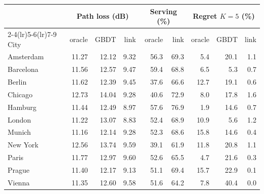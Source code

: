 \begin{tabular}{lrrrrrrrr}
\toprule
& \multicolumn{3}{c}{Path loss (dB)} & \multicolumn{2}{c}{Serving (\%)} & \multicolumn{3}{c}{Regret $K{=}5$ (\%)} \\
\cmidrule(lr){2-4}\cmidrule(lr){5-6}\cmidrule(lr){7-9}
City & oracle & GBDT & link & oracle & link & oracle & GBDT & link \\
\midrule
Amsterdam & 11.27 & 12.12 & 9.32 & 56.3 & 69.3 & 5.4 & 20.1 & 1.1 \\
Barcelona & 11.56 & 12.57 & 9.47 & 59.4 & 68.8 & 6.5 & 5.3 & 0.7 \\
Berlin & 11.62 & 12.39 & 9.45 & 37.6 & 66.6 & 12.7 & 19.1 & 0.6 \\
Chicago & 12.73 & 14.04 & 9.28 & 40.6 & 72.9 & 8.0 & 17.8 & 1.6 \\
Hamburg & 11.44 & 12.49 & 8.97 & 57.6 & 76.9 & 1.9 & 14.6 & 0.7 \\
London & 11.22 & 13.07 & 8.83 & 52.4 & 68.9 & 10.9 & 5.6 & 1.2 \\
Munich & 11.16 & 12.14 & 9.28 & 52.3 & 68.6 & 15.8 & 14.6 & 0.4 \\
New York & 12.56 & 13.74 & 9.59 & 39.1 & 61.9 & 11.8 & 20.8 & 1.1 \\
Paris & 11.77 & 12.97 & 9.60 & 52.6 & 65.5 & 4.7 & 21.6 & 0.3 \\
Prague & 11.40 & 12.17 & 9.13 & 51.1 & 69.4 & 15.7 & 22.9 & 0.1 \\
Vienna & 11.35 & 12.60 & 9.58 & 51.6 & 64.2 & 7.8 & 40.4 & 0.0 \\
\bottomrule
\end{tabular}
